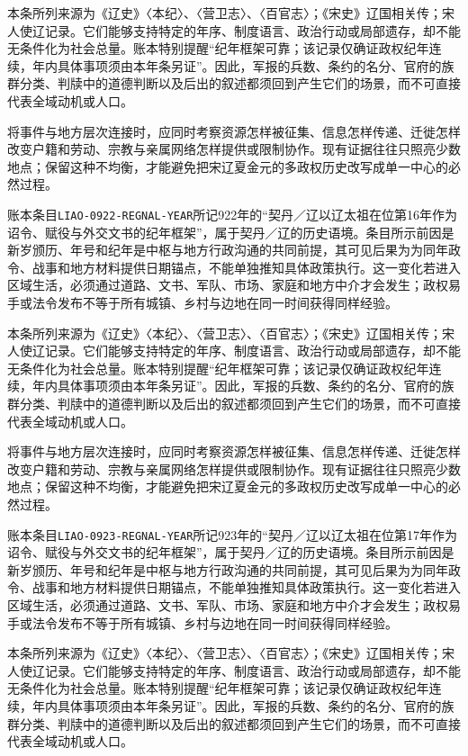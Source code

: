本条所列来源为《辽史》〈本纪〉、〈营卫志〉、〈百官志〉；《宋史》辽国相关传；宋人使辽记录。它们能够支持特定的年序、制度语言、政治行动或局部遗存，却不能无条件化为社会总量。账本特别提醒“纪年框架可靠；该记录仅确证政权纪年连续，年内具体事项须由本年条另证”。因此，军报的兵数、条约的名分、官府的族群分类、判牍中的道德判断以及后出的叙述都须回到产生它们的场景，而不可直接代表全域动机或人口。

将事件与地方层次连接时，应同时考察资源怎样被征集、信息怎样传递、迁徙怎样改变户籍和劳动、宗教与亲属网络怎样提供或限制协作。现有证据往往只照亮少数地点；保留这种不均衡，才能避免把宋辽夏金元的多政权历史改写成单一中心的必然过程。

账本条目\texttt{LIAO-0922-REGNAL-YEAR}所记922年的“契丹／辽以辽太祖在位第16年作为诏令、赋役与外交文书的纪年框架”，属于契丹／辽的历史语境。条目所示前因是新岁颁历、年号和纪年是中枢与地方行政沟通的共同前提，其可见后果为为同年政令、战事和地方材料提供日期锚点，不能单独推知具体政策执行。这一变化若进入区域生活，必须通过道路、文书、军队、市场、家庭和地方中介才会发生；政权易手或法令发布不等于所有城镇、乡村与边地在同一时间获得同样经验。

本条所列来源为《辽史》〈本纪〉、〈营卫志〉、〈百官志〉；《宋史》辽国相关传；宋人使辽记录。它们能够支持特定的年序、制度语言、政治行动或局部遗存，却不能无条件化为社会总量。账本特别提醒“纪年框架可靠；该记录仅确证政权纪年连续，年内具体事项须由本年条另证”。因此，军报的兵数、条约的名分、官府的族群分类、判牍中的道德判断以及后出的叙述都须回到产生它们的场景，而不可直接代表全域动机或人口。

将事件与地方层次连接时，应同时考察资源怎样被征集、信息怎样传递、迁徙怎样改变户籍和劳动、宗教与亲属网络怎样提供或限制协作。现有证据往往只照亮少数地点；保留这种不均衡，才能避免把宋辽夏金元的多政权历史改写成单一中心的必然过程。

账本条目\texttt{LIAO-0923-REGNAL-YEAR}所记923年的“契丹／辽以辽太祖在位第17年作为诏令、赋役与外交文书的纪年框架”，属于契丹／辽的历史语境。条目所示前因是新岁颁历、年号和纪年是中枢与地方行政沟通的共同前提，其可见后果为为同年政令、战事和地方材料提供日期锚点，不能单独推知具体政策执行。这一变化若进入区域生活，必须通过道路、文书、军队、市场、家庭和地方中介才会发生；政权易手或法令发布不等于所有城镇、乡村与边地在同一时间获得同样经验。

本条所列来源为《辽史》〈本纪〉、〈营卫志〉、〈百官志〉；《宋史》辽国相关传；宋人使辽记录。它们能够支持特定的年序、制度语言、政治行动或局部遗存，却不能无条件化为社会总量。账本特别提醒“纪年框架可靠；该记录仅确证政权纪年连续，年内具体事项须由本年条另证”。因此，军报的兵数、条约的名分、官府的族群分类、判牍中的道德判断以及后出的叙述都须回到产生它们的场景，而不可直接代表全域动机或人口。

